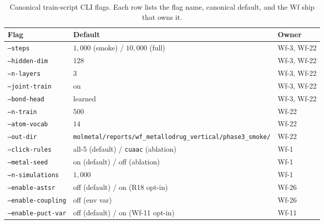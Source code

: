 \begin{table}[h]
  \centering
  \small
  \caption{Canonical train-script CLI flags.  Each row lists the
  flag name, canonical default, and the Wf ship that owns it.}
  \label{tab:cli-flags}
  \begin{tabular}{lll}
    \toprule
    \textbf{Flag} & \textbf{Default} & \textbf{Owner} \\
    \midrule
    \texttt{--steps} & $1{,}000$ (smoke) / $10{,}000$ (full)
      & Wf-3, Wf-22 \\
    \texttt{--hidden-dim} & $128$ & Wf-3, Wf-22 \\
    \texttt{--n-layers} & $3$ & Wf-3, Wf-22 \\
    \texttt{--joint-train} & on & Wf-3, Wf-22 \\
    \texttt{--bond-head} & learned & Wf-3, Wf-22 \\
    \texttt{--n-train} & $500$ & Wf-22 \\
    \texttt{--atom-vocab} & $14$ & Wf-22 \\
    \texttt{--out-dir}
      & \texttt{molmetal/reports/wf\_metallodrug\_vertical/phase3\_smoke/}
      & Wf-22 \\
    \texttt{--click-rules} & all-5 (default) / \texttt{cuaac} (ablation)
      & Wf-1 \\
    \texttt{--metal-seed} & on (default) / off (ablation)
      & Wf-1 \\
    \texttt{--n-simulations} & $1{,}000$ & Wf-1 \\
    \texttt{--enable-astsr} & off (default) / on (R18 opt-in)
      & Wf-26 \\
    \texttt{--enable-coupling} & off (env var) & Wf-26 \\
    \texttt{--enable-puct-var} & off (default) / on (Wf-11 opt-in)
      & Wf-11 \\
    \bottomrule
  \end{tabular}
\end{table}

